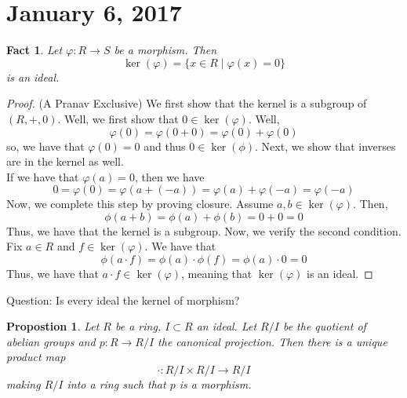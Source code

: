 \documentclass{amsart}
\newtheorem{fact}[thm]{Fact}
\newtheorem{prop}[thm]{Propostion}
\theoremstyle{definition}
\theoremstyle{remark}
\begin{document}
\section{January 6, 2017} %
\begin{fact}
    Let $\varphi: R \rightarrow S$ be a morphism. Then
    $$
    \ker(\varphi) = \{x \in R \mid \varphi(x) = 0\}
    $$
    is an ideal.
\end{fact}
\begin{proof} (A Pranav Exclusive)
    We first show that the kernel is a subgroup of $(R, +, 0)$. Well, we first show that
    $0 \in \ker(\varphi)$. Well,
    $$
    \varphi(0) = \varphi(0 + 0) = \varphi(0) + \varphi(0)
    $$
    so, we have that $\varphi(0) = 0$ and thus $0 \in \ker(\phi)$.
    Next, we show that inverses are in the kernel as well. \\
    If we have that $\varphi(a) = 0$, then we have
    $$0 = \varphi(0) = \varphi(a + (-a)) = \varphi(a) + \varphi(-a) = \varphi(-a)$$
    Now, we complete this step by proving closure. Assume $a,b \in \ker(\varphi)$. Then,
    $$\phi(a + b) = \phi(a) + \phi(b) = 0 + 0 = 0$$
    Thus, we have that the kernel is a subgroup. Now, we verify the second condition.
    Fix $a \in R$ and $f \in \ker(\varphi)$. We have that
    $$
    \phi(a \cdot f) = \phi(a) \cdot \phi(f) = \phi(a) \cdot 0 = 0
    $$
    Thus, we have that $a \cdot f \in \ker(\varphi)$, meaning that $\ker(\varphi)$
    is an ideal.
\end{proof}
\noindent Question: Is every ideal the kernel of morphism?
\begin{prop}
    Let $R$ be a ring, $I \subset R$ an ideal. Let $R / I$ be the quotient of
    abelian groups and $p: R \rightarrow R / I$ the canonical projection. Then there is a
    unique product map
    $$
    \cdot: R/I \times R/I \rightarrow R/I
    $$
    making $R / I$ into a ring such that $p$ is a morphism.
\end{prop}
\end{document}
